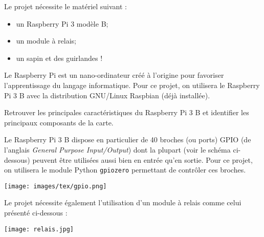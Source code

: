 \documentclass[a4paper]{article}
\begin{document}
Le projet nécessite le matériel suivant :

\begin{itemize}
  \item un Raspberry Pi 3 modèle B;
  \item un module à relais;
  \item un sapin et des guirlandes !
\end{itemize}

\bigskip

Le Raspberry Pi est un \og{}nano-ordinateur\fg{} créé à l'origine pour favoriser l'apprentissage du langage informatique. Pour ce projet, on utilisera le Raspberry Pi 3 B avec la distribution GNU/Linux Raspbian (déjà installée).

\bigskip

\activite
Retrouver les principales caractéristiques du Raspberry Pi 3 B et identifier les principaux composants de la carte.

\bigskip

Le Raspberry Pi 3 B dispose en particulier de 40 broches (ou ports) GPIO (de l'anglais \textit{General Purpose Input/Output}) dont la plupart (voir le schéma ci-dessous) peuvent être utilisées aussi bien en entrée qu'en sortie. Pour ce projet, on utilisera le module Python \verb|gpiozero| permettant de contrôler ces broches.

\begin{center}
  \texttt{[image: images/tex/gpio.png]}
\end{center}

Le projet nécessite également l'utilisation d'un module à relais comme celui présenté ci-dessous :

\begin{center}
  \texttt{[image: relais.jpg]}
\end{center}

\pagebreak
\end{document}

